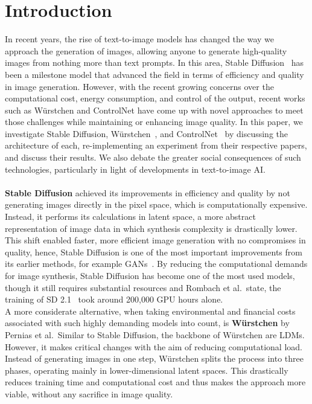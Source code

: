 \section{Introduction}
In recent years, the rise of text-to-image models has changed the way we approach the generation of images, allowing anyone to generate high-quality images from nothing more than text prompts. In this area, Stable Diffusion~\cite{rombach2022stablediffusion} has been a milestone model that advanced the field in terms of efficiency and quality in image generation. However, with the recent growing concerns over the computational cost, energy consumption, and control of the output, recent works such as Würstchen and ControlNet have come up with novel approaches to meet those challenges while maintaining or enhancing image quality. In this paper, we investigate Stable Diffusion, Würstchen~\cite{pernias2024wrstchen}, and ControlNet~\cite{zhang2023addingconditionalcontroltexttoimage} by discussing the architecture of each, re-implementing an experiment from their respective papers, and discuss their results. We also debate the greater social consequences of such technologies, particularly in light of developments in text-to-image AI.
\\
\\
\noindent
\textbf{Stable Diffusion} achieved its improvements in efficiency and quality by not generating images directly in the pixel space, which is computationally expensive. Instead, it performs its calculations in latent space, a more abstract representation of image data in which synthesis complexity is drastically lower. This shift enabled faster, more efficient image generation with no compromises in quality, hence, Stable Diffusion is one of the most important improvements from its earlier methods, for example GANs~\cite{dhariwal2021diffusionmodelsbeatgans}. By reducing the computational demands for image synthesis, Stable Diffusion has become one of the most used models, though it still requires substantial resources and Rombach et al.\ state, the training of SD 2.1~\cite{rombach2023sd_2_1} took around 200,000 GPU hours alone.
\\
\noindent
A more considerate alternative, when taking environmental and financial costs associated with such highly demanding models into count, is \textbf{Würstchen} by Pernias et al.\ Similar to Stable Diffusion, the backbone of Würstchen are LDMs. However, it makes critical changes with the aim of reducing computational load. Instead of generating images in one step, Würstchen splits the process into three phases, operating mainly in lower-dimensional latent spaces. This drastically reduces training time and computational cost and thus makes the approach more viable, without any sacrifice in image quality.
